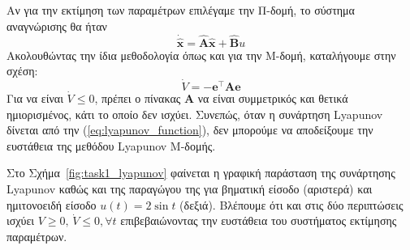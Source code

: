 \documentclass[a4paper,12pt]{article}
\begin{document}
Αν για την εκτίμηση των παραμέτρων επιλέγαμε την Π-δομή, το σύστημα αναγνώρισης θα ήταν
\[
    \dot{\hat{\mathbf{x}}} = \hat{\mathbf{A}}\hat{\mathbf{x}} + \hat{\mathbf{B}} u
\]
Ακολουθώντας την ίδια μεθοδολογία όπως και για την Μ-δομή, καταλήγουμε στην σχέση:
\[
\dot{V} = -\mathbf{e}^{\top}\mathbf{Α}\mathbf{e} 
\]
Για να είναι $\dot{V} \leq 0$, πρέπει ο πίνακας $\mathbf{A}$ να είναι συμμετρικός και θετικά ημιορισμένος,
κάτι το οποίο δεν ισχύει. Συνεπώς, όταν η συνάρτηση Lyapunov
δίνεται από την (\ref{eq:lyapunov_function}), δεν μπορούμε να αποδείξουμε την ευστάθεια της μεθόδου 
Lyapunov Μ-δομής.

Στο Σχήμα~\ref{fig:task1_lyapunov} φαίνεται η γραφική παράσταση της συνάρτησης 
Lyapunov καθώς και της παραγώγου της για βηματική είσοδο
(αριστερά) και ημιτονοειδή είσοδο $u(t) = 2 \sin t$ (δεξιά). Βλέπουμε ότι και στις δύο περιπτώσεις ισχύει
$V \geq 0, \, \dot{V} \leq 0, \forall t$ επιβεβαιώνοντας την ευστάθεια του συστήματος εκτίμησης παραμέτρων.
\end{document}
